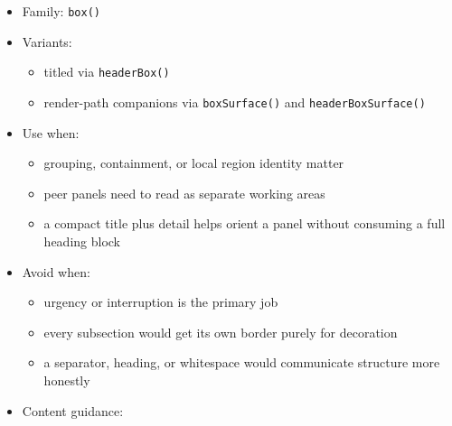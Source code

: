 \begin{itemize}
\tightlist
\item
  Family: \texttt{b\allowbreak{}o\allowbreak{}x\allowbreak{}(\allowbreak{})}
\item
  Variants:

  \begin{itemize}
  \tightlist
  \item
    titled via \texttt{h\allowbreak{}e\allowbreak{}a\allowbreak{}d\allowbreak{}e\allowbreak{}r\allowbreak{}B\allowbreak{}o\allowbreak{}x\allowbreak{}(\allowbreak{})}
  \item
    render-path companions via \texttt{b\allowbreak{}o\allowbreak{}x\allowbreak{}S\allowbreak{}u\allowbreak{}r\allowbreak{}f\allowbreak{}a\allowbreak{}c\allowbreak{}e\allowbreak{}(\allowbreak{})} and \texttt{h\allowbreak{}e\allowbreak{}a\allowbreak{}d\allowbreak{}e\allowbreak{}r\allowbreak{}B\allowbreak{}o\allowbreak{}x\allowbreak{}S\allowbreak{}u\allowbreak{}r\allowbreak{}f\allowbreak{}a\allowbreak{}c\allowbreak{}e\allowbreak{}(\allowbreak{})}
  \end{itemize}
\item
  Use when:

  \begin{itemize}
  \tightlist
  \item
    grouping, containment, or local region identity matter
  \item
    peer panels need to read as separate working areas
  \item
    a compact title plus detail helps orient a panel without consuming a full heading block
  \end{itemize}
\item
  Avoid when:

  \begin{itemize}
  \tightlist
  \item
    urgency or interruption is the primary job
  \item
    every subsection would get its own border purely for decoration
  \item
    a separator, heading, or whitespace would communicate structure more honestly
  \end{itemize}
\item
  Content guidance:


\end{itemize}
